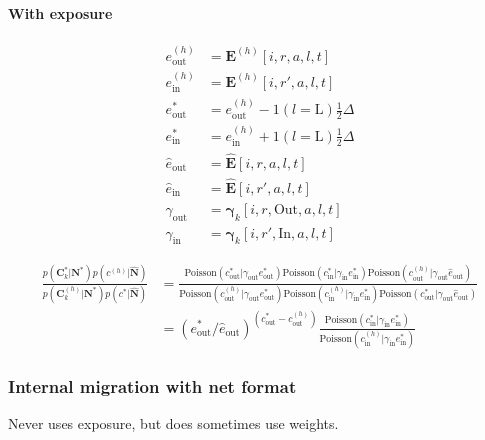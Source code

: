\documentclass{article}
\begin{document}
\paragraph{With exposure}

\begin{align}
  e_{\text{out}}^{(h)} & = \bm{E}^{(h)}[i, r, a, l, t] \\
  e_{\text{in}}^{(h)} & = \bm{E}^{(h)}[i, r', a, l, t] \\
  e_{\text{out}}^* & = e_{\text{out}}^{(h)} - 1(l = \text{L}) \tfrac{1}{2} \Delta \\
  e_{\text{in}}^* & = e_{\text{in}}^{(h)} + 1(l = \text{L}) \tfrac{1}{2} \Delta \\
  \hat{e}_{\text{out}} & = \hat{\bm{E}}[i, r, a, l, t] \\
  \hat{e}_{\text{in}} & = \hat{\bm{E}}[i, r', a, l, t] \\
  \gamma_{\text{out}} & = \bm{\gamma}_k[i, r, \text{Out}, a, l, t] \\
  \gamma_{\text{in}} & = \bm{\gamma}_k[i, r', \text{In}, a, l, t]
\end{align}

\begin{align}
\frac{p(\bm{C}_k^* | \bm{N}^*) p(c^{(h)} | \hat{\bm{N}})  }{p(\bm{C}_k^{(h)} | \bm{N}^*) p(c^* | \hat{\bm{N}}) } 
  & = \frac{ \text{Poisson}\left( c_{\text{out}}^* | \gamma_{\text{out}} e_{\text{out}}^* \right) \text{Poisson}\left( c_{\text{in}}^* | \gamma_{\text{in}} e_{\text{in}}^* \right) \text{Poisson}\left( c_{\text{out}}^{(h)} | \gamma_{\text{out}} \hat{e}_{\text{out}} \right) }{ \text{Poisson}\left( c_{\text{out}}^{(h)} | \gamma_{\text{out}} e_{\text{out}}^* \right) \text{Poisson}\left( c_{\text{in}}^{(h)} | \gamma_{\text{in}} e_{\text{in}}^* \right) \text{Poisson}\left( c_{\text{out}}^* | \gamma_{\text{out}} \hat{e}_{\text{out}} \right) } \\
  & = (e_{\text{out}}^* / \hat{e}_{\text{out}} )^{(c_{\text{out}}^* - c_{\text{out}}^{(h)})} \frac{ \text{Poisson}\left( c_{\text{in}}^* | \gamma_{\text{in}} e_{\text{in}}^* \right)  }{ \text{Poisson}\left( c_{\text{in}}^{(h)} | \gamma_{\text{in}} e_{\text{in}}^* \right )}
\end{align}

\subsubsection{Internal migration with net format}

Never uses exposure, but does sometimes use weights.
\end{document}
